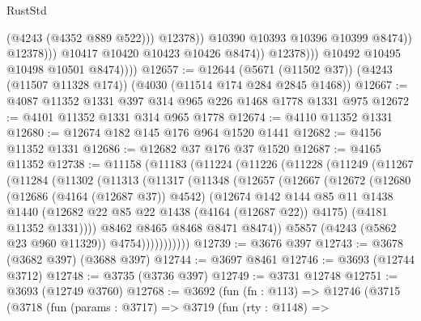 \begin{lexlean}{RustStd}
\begin{coremodule}
                                      (@4243 (@4352 @889 @522)))
                                    @12378))
                                @10390
                                @10393
                                @10396
                                @10399
                                @8474))
                            @12378)))
                      @10417
                      @10420
                      @10423
                      @10426
                      @8474))
                  @12378)))
            @10492
            @10495
            @10498
            @10501
            @8474))))
@12657 := @12644
    (@5671 (@11502 @37))
    (@4243 (@11507 @11328 @174))
    (@4030 (@11514 @174 @284 @2845 @1468))
@12667 := @4087 @11352 @1331 @397 @314 @965 @226 @1468 @1778 @1331 @975
@12672 := @4101 @11352 @1331 @314 @965 @1778
@12674 := @4110 @11352 @1331
@12680 := @12674 @182 @145 @176 @964 @1520 @1441
@12682 := @4156 @11352 @1331
@12686 := @12682 @37 @176 @37 @1520
@12687 := @4165 @11352
@12738 := @11158
    (@11183
      (@11224
        (@11226
          (@11228
            (@11249
              (@11267
                (@11284
                  (@11302
                    (@11313
                      (@11317
                        (@11348
                          (@12657
                            (@12667
                              (@12672
                                (@12680
                                  (@12686 (@4164 (@12687 @37)) @4542)
                                  (@12674
                                    @142
                                    @144
                                    @85
                                    @11
                                    @1438
                                    @1440
                                    (@12682 @22 @85 @22 @1438 (@4164 (@12687 @22)) @4175)
                                    (@4181 @11352 @1331))))
                              @8462
                              @8465
                              @8468
                              @8471
                              @8474))
                          @5857
                          (@4243 (@5862 @23 @960 @11329))
                          @4754)))))))))))
@12739 := @3676 @397
@12743 := @3678 (@3682 @397) (@3688 @397)
@12744 := @3697 @8461
@12746 := @3693 (@12744 @3712)
@12748 := @3735 (@3736 @397)
@12749 := @3731 @12748
@12751 := @3693 (@12749 @3760)
@12768 := @3692
    (fun (fn : @113) =>
    @12746
      (@3715
        (@3718
          (fun (params : @3717) =>
          @3719
            (fun (rty : @1148) =>

\end{coremodule}
\end{lexlean}
